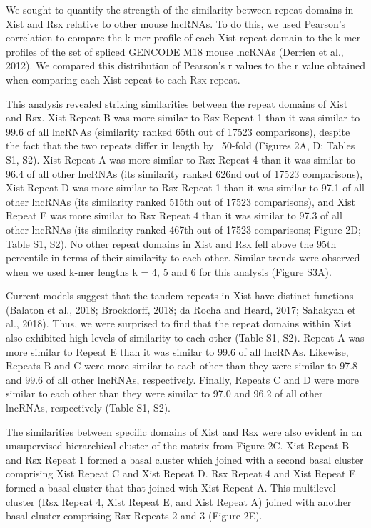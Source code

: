 We sought to quantify the strength of the similarity between repeat domains in Xist and Rsx relative to other mouse lncRNAs. To do this, we used Pearson’s correlation to compare the k-mer profile of each Xist repeat domain to the k-mer profiles of the set of spliced GENCODE M18 mouse lncRNAs (Derrien et al., 2012). We compared this distribution of Pearson’s r values to the r value obtained when comparing each Xist repeat to each Rsx repeat. 

This analysis revealed striking similarities between the repeat domains of Xist and Rsx. Xist Repeat B was more similar to Rsx Repeat 1 than it was similar to 99.6 of all lncRNAs (similarity ranked 65th out of 17523 comparisons), despite the fact that the two repeats differ in length by ~50-fold (Figures 2A, D; Tables S1, S2). Xist Repeat A was more similar to Rsx Repeat 4 than it was similar to 96.4 of all other lncRNAs (its similarity ranked 626nd out of 17523 comparisons), Xist Repeat D was more similar to Rsx Repeat 1 than it was similar to 97.1 of all other lncRNAs (its similarity ranked 515th out of 17523 comparisons), and Xist Repeat E was more similar to Rsx Repeat 4 than it was similar to 97.3 of all other lncRNAs (its similarity ranked 467th out of 17523 comparisons; Figure 2D; Table S1, S2). No other repeat domains in Xist and Rsx fell above the 95th percentile in terms of their similarity to each other. Similar trends were observed when we used k-mer lengths k = 4, 5 and 6 for this analysis (Figure S3A). 

Current models suggest that the tandem repeats in Xist have distinct functions (Balaton et al., 2018; Brockdorff, 2018; da Rocha and Heard, 2017; Sahakyan et al., 2018). Thus, we were surprised to find that the repeat domains within Xist also exhibited high levels of similarity to each other (Table S1, S2). Repeat A was more similar to Repeat E than it was similar to 99.6 of all lncRNAs. Likewise, Repeats B and C were more similar to each other than they were similar to 97.8 and 99.6 of all other lncRNAs, respectively. Finally, Repeats C and D were more similar to each other than they were similar to 97.0 and 96.2 of all other lncRNAs, respectively (Table S1, S2). 

The similarities between specific domains of Xist and Rsx were also evident in an unsupervised hierarchical cluster of the matrix from Figure 2C. Xist Repeat B and Rsx Repeat 1 formed a basal cluster which joined with a second basal cluster comprising Xist Repeat C and Xist Repeat D.   Rsx Repeat 4 and Xist Repeat E formed a basal cluster that that joined with Xist Repeat A. This multilevel cluster (Rsx Repeat 4, Xist Repeat E, and Xist Repeat A) joined with another basal cluster comprising Rsx Repeats 2 and 3 (Figure 2E). 

